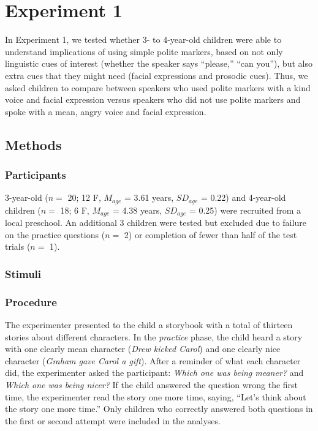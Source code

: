 \documentclass[10pt, letterpaper]{article}
\begin{document}
\section{Experiment 1}\label{experiment-1}

In Experiment 1, we tested whether 3- to 4-year-old children were able
to understand implications of using simple polite markers, based on not
only linguistic cues of interest (whether the speaker says ``please,''
``can you''), but also extra cues that they might need (facial
expressions and prosodic cues). Thus, we asked children to compare
between speakers who used polite markers with a kind voice and facial
expression versus speakers who did not use polite markers and spoke with
a mean, angry voice and facial expression.

\subsection{Methods}\label{methods}

\subsubsection{Participants}\label{participants}

3-year-old (\(n=\) 20; 12 F, \(M_{age}\) = 3.61 years, \(SD_{age}\) =
0.22) and 4-year-old children (\(n=\) 18; 6 F, \(M_{age}\) = 4.38 years,
\(SD_{age}\) = 0.25) were recruited from a local preschool. An
additional 3 children were tested but excluded due to failure on the
practice questions (\(n=\) 2) or completion of fewer than half of the
test trials (\(n=\) 1).

\subsubsection{Stimuli}\label{stimuli}

\subsubsection{Procedure}\label{procedure}

The experimenter presented to the child a storybook with a total of
thirteen stories about different characters. In the \emph{practice}
phase, the child heard a story with one clearly mean character
(\emph{Drew kicked Carol}) and one clearly nice character (\emph{Graham
gave Carol a gift}). After a reminder of what each character did, the
experimenter asked the participant: \emph{Which one was being meaner?}
and \emph{Which one was being nicer?} If the child answered the question
wrong the first time, the experimenter read the story one more time,
saying, ``Let's think about the story one more time.'' Only children who
correctly answered both questions in the first or second attempt were
included in the analyses.
\end{document}
